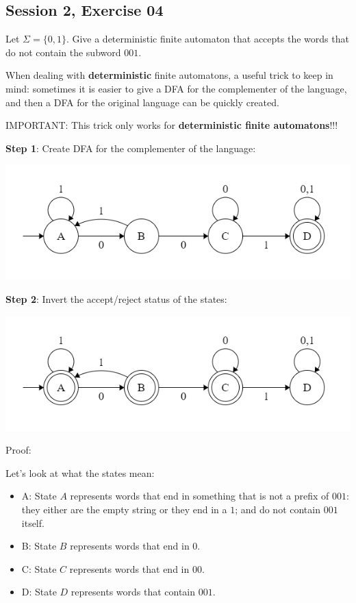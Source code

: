 \subsection{Session 2, Exercise 04}


Let $\Sigma=\{0,1\}$. Give a deterministic finite automaton that accepts the words that do not contain the subword $001$.


When dealing with \textbf{deterministic} finite automatons, a useful trick to keep in mind: sometimes it is easier to give a DFA for the complementer of the language, and then a DFA for the original language can be quickly created.

IMPORTANT: This trick only works for \textbf{deterministic finite automatons}!!!

\textbf{Step 1}: Create DFA for the complementer of the language:

\includegraphics[width=0.6\linewidth]{02/2_4.png}

\textbf{Step 2}: Invert the accept/reject status of the states:

\includegraphics[width=0.6\linewidth]{02/2_4_inv.png}

Proof:

Let's look at what the states mean:

\begin{itemize}
    \item A: State $A$ represents words that end in something that is not a prefix of $001$: they either are the empty string or they end in a $1$; and do not contain $001$ itself.
    \item B: State $B$ represents words that end in $0$.
    \item C: State $C$ represents words that end in $00$.
    \item D: State $D$ represents words that contain $001$.
\end{itemize}

